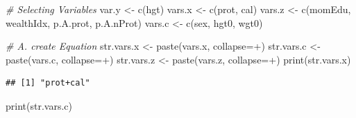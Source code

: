 \documentclass[
]{book}
\newenvironment{Shaded}{\begin{snugshade}}{\end{snugshade}}
\newcommand{\AttributeTok}[1]{\textcolor[rgb]{0.77,0.63,0.00}{#1}}
\newcommand{\CommentTok}[1]{\textcolor[rgb]{0.56,0.35,0.01}{\textit{#1}}}
\newcommand{\FunctionTok}[1]{\textcolor[rgb]{0.00,0.00,0.00}{#1}}
\newcommand{\NormalTok}[1]{#1}
\newcommand{\OtherTok}[1]{\textcolor[rgb]{0.56,0.35,0.01}{#1}}
\newcommand{\StringTok}[1]{\textcolor[rgb]{0.31,0.60,0.02}{#1}}
\begin{document}
\begin{Shaded}
\begin{Highlighting}[]
\CommentTok{\# Selecting Variables}
\NormalTok{var.y }\OtherTok{\textless{}{-}} \FunctionTok{c}\NormalTok{(}\StringTok{\textquotesingle{}hgt\textquotesingle{}}\NormalTok{)}
\NormalTok{vars.x }\OtherTok{\textless{}{-}} \FunctionTok{c}\NormalTok{(}\StringTok{\textquotesingle{}prot\textquotesingle{}}\NormalTok{, }\StringTok{\textquotesingle{}cal\textquotesingle{}}\NormalTok{)}
\NormalTok{vars.z }\OtherTok{\textless{}{-}} \FunctionTok{c}\NormalTok{(}\StringTok{\textquotesingle{}momEdu\textquotesingle{}}\NormalTok{, }\StringTok{\textquotesingle{}wealthIdx\textquotesingle{}}\NormalTok{, }\StringTok{\textquotesingle{}p.A.prot\textquotesingle{}}\NormalTok{, }\StringTok{\textquotesingle{}p.A.nProt\textquotesingle{}}\NormalTok{)}
\NormalTok{vars.c }\OtherTok{\textless{}{-}} \FunctionTok{c}\NormalTok{(}\StringTok{\textquotesingle{}sex\textquotesingle{}}\NormalTok{, }\StringTok{\textquotesingle{}hgt0\textquotesingle{}}\NormalTok{, }\StringTok{\textquotesingle{}wgt0\textquotesingle{}}\NormalTok{)}
\end{Highlighting}
\end{Shaded}

\begin{Shaded}
\begin{Highlighting}[]
\CommentTok{\# A. create Equation}
\NormalTok{str.vars.x }\OtherTok{\textless{}{-}} \FunctionTok{paste}\NormalTok{(vars.x, }\AttributeTok{collapse=}\StringTok{\textquotesingle{}+\textquotesingle{}}\NormalTok{)}
\NormalTok{str.vars.c }\OtherTok{\textless{}{-}} \FunctionTok{paste}\NormalTok{(vars.c, }\AttributeTok{collapse=}\StringTok{\textquotesingle{}+\textquotesingle{}}\NormalTok{)}
\NormalTok{str.vars.z }\OtherTok{\textless{}{-}} \FunctionTok{paste}\NormalTok{(vars.z, }\AttributeTok{collapse=}\StringTok{\textquotesingle{}+\textquotesingle{}}\NormalTok{)}
\FunctionTok{print}\NormalTok{(str.vars.x)}
\end{Highlighting}
\end{Shaded}

\begin{verbatim}
## [1] "prot+cal"
\end{verbatim}

\begin{Shaded}
\begin{Highlighting}[]
\FunctionTok{print}\NormalTok{(str.vars.c)}
\end{Highlighting}
\end{Shaded}
\end{document}
